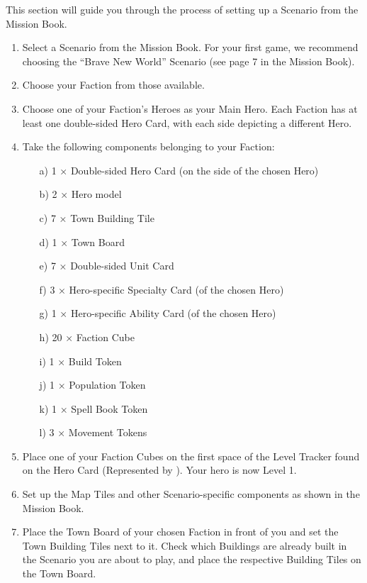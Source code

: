\begin{multicols*}{2}

This section will guide you through the process of setting up a Scenario from the Mission Book.

\begin{enumerate}
  \item Select a Scenario from the Mission Book.
    For your first game, we recommend choosing the ``Brave New World'' Scenario (see page 7 in the Mission Book).
  \item Choose your Faction from those available.
  \item Choose one of your Faction's Heroes as your Main Hero.
    Each Faction has at least one double-sided Hero Card, with each side depicting a different Hero.
  \item Take the following components belonging to your Faction:
  \begin{itemize}
    \item[a)]1 × Double-sided Hero Card (on the side of the chosen Hero)
    \item[b)]2 × Hero model
    \item[c)]7 × Town Building Tile
    \item[d)]1 × Town Board
    \item[e)]7 × Double-sided Unit Card
    \item[f)]3 × Hero-specific Specialty Card (of the chosen Hero)
    \item[g)]1 × Hero-specific Ability Card (of the chosen Hero)
    \item[h)]20 × Faction Cube
    \item[i)]1 × Build Token
    \item[j)]1 × Population Token
    \item[k)]1 × Spell Book Token
    \item[l)]3 × Movement Tokens
  \end{itemize}
  \item Place one of your Faction Cubes on the first space of the Level Tracker found on the Hero Card (Represented by ).
    Your hero is now Level 1.
  \item Set up the Map Tiles and other Scenario-specific components as shown in the Mission Book.
  \item Place the Town Board of your chosen Faction in front of you and set the Town Building Tiles next to it.
    Check which Buildings are already built in the Scenario you are about to play, and place the respective Building Tiles on the Town Board.

\end{enumerate}
\end{multicols*}
